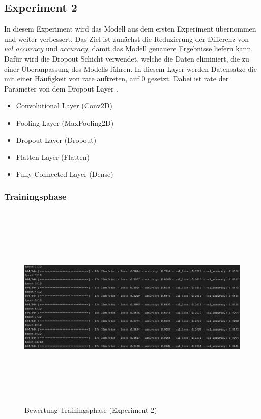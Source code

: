 \documentclass[12pt]{scrreprt}
\begin{document}
\subsection{Experiment 2}\label{model:ep2}
	
In diesem Experiment wird das Modell aus dem ersten Experiment übernommen und weiter verbessert. Das Ziel ist zunächst die Reduzierung der Differenz von $val\_accuracy$ und $accuracy$, damit das Modell genauere Ergebnisse liefern kann. Dafür wird die Dropout Schicht verwendet, welche die Daten eliminiert, die zu einer Überanpassung des Modells führen. In diesem Layer werden Datensatze die mit einer Häufigkeit von rate auftreten, auf 0 gesetzt. Dabei ist rate der Parameter von dem Dropout Layer \cite{tensorflow2022}.\\

\begin{itemize}
	\item Convolutional Layer (Conv2D)
	\item Pooling Layer (MaxPooling2D)
	\item Dropout Layer (Dropout)
	\item Flatten Layer (Flatten)
	\item Fully-Connected Layer (Dense)
	\label{tab:model2}
\end{itemize}

\subsubsection{Trainingsphase}

\begin{figure}[h!]
	\centering
	\includegraphics[width=13.5cm, height=10cm]		{ExperimentModelTrainingsphase_2.png}
	\caption{ Bewertung Trainingsphase \cite{HK22}(Experiment 2)}
	\label{fig:fig16}
\end{figure}
\end{document}
